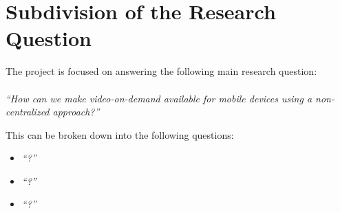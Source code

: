 \section{Subdivision of the Research Question}
The project is focused on answering the following main research question:\\
\\
\textit{``How can we make video-on-demand available for mobile devices using a non-centralized approach?''}

This can be broken down into the following questions:

\begin{itemize}
	\item\textit{``?''}
	\item\textit{``?''}
	\item\textit{``?''}
\end{itemize}
